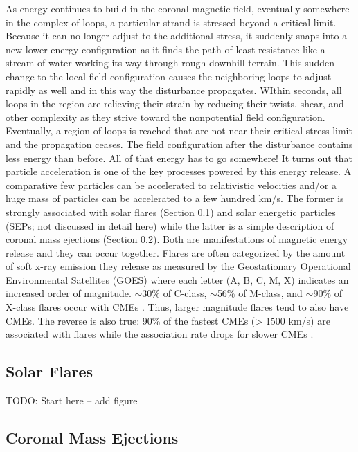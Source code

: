 As energy continues to build in the coronal magnetic field, eventually somewhere in the complex of loops, a particular strand is stressed beyond a critical limit. Because it can no longer adjust to the additional stress, it suddenly snaps into a new lower-energy configuration as it finds the path of least resistance like a stream of water working its way through rough downhill terrain. This sudden change to the local field configuration causes the neighboring loops to adjust rapidly as well and in this way the disturbance propagates. WIthin seconds, all loops in the region are relieving their strain by reducing their twists, shear, and other complexity as they strive toward the nonpotential field configuration. Eventually, a region of loops is reached that are not near their critical stress limit and the propagation ceases. The field configuration after the disturbance contains less energy than before. All of that energy has to go somewhere! It turns out that particle acceleration is one of the key processes powered by this energy release. A comparative few particles can be accelerated to relativistic velocities and/or a huge mass of particles can be accelerated to a few hundred km/s. The former is strongly associated with solar flares (Section \ref{sec:solarflares}) and solar energetic particles (SEPs; not discussed in detail here) while the latter is a simple description of coronal mass ejections (Section \ref{sec:cmes}). Both are manifestations of magnetic energy release and they can occur together. Flares are often categorized by the amount of soft x-ray emission they release as measured by the Geostationary Operational Environmental Satellites (GOES) where each letter (A, B, C, M, X) indicates an increased order of magnitude. $\sim$30\% of C-class, $\sim$56\% of M-class, and $\sim$90\% of X-class flares occur with CMEs \citep{Yashiro2005, Wang2007}. Thus, larger magnitude flares tend to also have CMEs. The reverse is also true: 90\% of the fastest CMEs (> 1500 km/s) are associated with flares while the association rate drops for slower CMEs \citep{Wang2008}. 

\subsection{Solar Flares}
\label{sec:solarflares}
TODO: Start here -- add figure

\subsection{Coronal Mass Ejections}
\label{sec:cmes}

